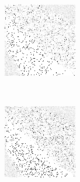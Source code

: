 \begin{figure}
	\begin{subfigure}[t]{0.22\textwidth}
		\includegraphics[width=\textwidth]{images/findings/round1/strategies_cribminavg.png}
		\caption{\cribminavg}
	\end{subfigure}
	~
	\begin{subfigure}[t]{0.22\textwidth}
		\includegraphics[width=\textwidth]{images/findings/round1/strategies_peggingmaxavggained.png}

\end{subfigure}
\end{figure}
